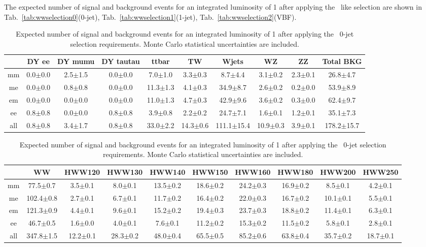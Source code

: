 The expected number of signal and background events for an integrated 
luminosity of 1\ifb{} after applying the 
\WW\ like selection are shown in Tab.~\ref{tab:wwselection0}(0-jet), Tab.~\ref{tab:wwselection1}(1-jet), Tab.~\ref{tab:wwselection2}(VBF).

\begin{table}[!ht]
  \begin{center}
 {\small
  \begin{tabular} {|c|c|c|c|c|c|c|c|c|c|}
\hline
  & DY ee & DY mumu & DY tautau & ttbar & TW & Wjets & WZ & ZZ & Total BKG \\
  \hline
  \hline
  mm &  0.0$\pm$0.0 &  2.5$\pm$1.5 &  0.0$\pm$0.0 &  7.0$\pm$1.0 &  3.3$\pm$0.3 &   8.7$\pm$4.4 &  3.1$\pm$0.2 &  2.3$\pm$0.1 &  26.8$\pm$4.7 \\
  me &  0.0$\pm$0.0 &  0.8$\pm$0.8 &  0.0$\pm$0.0 & 11.3$\pm$1.3 &  4.1$\pm$0.3 &  34.9$\pm$8.7 &  2.6$\pm$0.2 &  0.2$\pm$0.0 &  53.9$\pm$8.9 \\
  em &  0.0$\pm$0.0 &  0.0$\pm$0.0 &  0.0$\pm$0.0 & 11.0$\pm$1.3 &  4.7$\pm$0.3 &  42.9$\pm$9.6 &  3.6$\pm$0.2 &  0.3$\pm$0.0 &  62.4$\pm$9.7 \\
  ee &  0.8$\pm$0.8 &  0.0$\pm$0.0 &  0.8$\pm$0.8 &  3.9$\pm$0.8 &  2.2$\pm$0.2 &  24.7$\pm$7.1 &  1.6$\pm$0.1 &  1.2$\pm$0.1 &  35.1$\pm$7.3 \\
 \hline
 all &  0.8$\pm$0.8 &  3.4$\pm$1.7 &  0.8$\pm$0.8 & 33.0$\pm$2.2 & 14.3$\pm$0.6 & 111.1$\pm$15.4& 10.9$\pm$0.3 &  3.9$\pm$0.1 & 178.2$\pm$15.7\\
 \hline
  \end{tabular}
  }
 {\small
  \begin{tabular} {|c|c|c|c|c|c|c|c|c|c|}
  \hline
  & WW  &  HWW120 &  HWW130 &  HWW140 & HWW150 &  HWW160 &  HWW180 &  HWW200 &  HWW250 \\
  \hline
  \hline
  mm &  77.5$\pm$0.7 &  3.5$\pm$0.1 &  8.0$\pm$0.1 & 13.5$\pm$0.2 & 18.6$\pm$0.2 & 24.2$\pm$0.3 & 16.9$\pm$0.2 &  8.5$\pm$0.1 &  4.2$\pm$0.1 \\
  me & 102.4$\pm$0.8 &  2.7$\pm$0.1 &  6.7$\pm$0.1 & 11.7$\pm$0.2 & 16.4$\pm$0.2 & 22.0$\pm$0.3 & 16.7$\pm$0.2 & 10.1$\pm$0.1 &  5.5$\pm$0.1 \\
  em & 121.3$\pm$0.9 &  4.4$\pm$0.1 &  9.6$\pm$0.1 & 15.2$\pm$0.2 & 19.4$\pm$0.3 & 23.7$\pm$0.3 & 18.8$\pm$0.2 & 11.4$\pm$0.1 &  6.3$\pm$0.1 \\
  ee &  46.7$\pm$0.5 &  1.6$\pm$0.0 &  4.0$\pm$0.1 &  7.6$\pm$0.1 & 11.2$\pm$0.2 & 15.3$\pm$0.2 & 11.5$\pm$0.2 &  5.8$\pm$0.1 &  2.8$\pm$0.1 \\
  \hline
 all & 347.8$\pm$1.5 & 12.2$\pm$0.1 & 28.3$\pm$0.2 & 48.0$\pm$0.4 & 65.5$\pm$0.5 & 85.2$\pm$0.6 & 63.8$\pm$0.4 & 35.7$\pm$0.2 & 18.7$\pm$0.1 \\
 \hline
  \end{tabular}
  }
  \caption{Expected number of signal and background events for an 
  integrated luminosity of 1\ifb{} after 
  applying the \ww\ 0-jet selection requirements. Monte Carlo statistical uncertainties are 
  included.}
   \label{tab:wwselection}
  \end{center}
\end{table}
